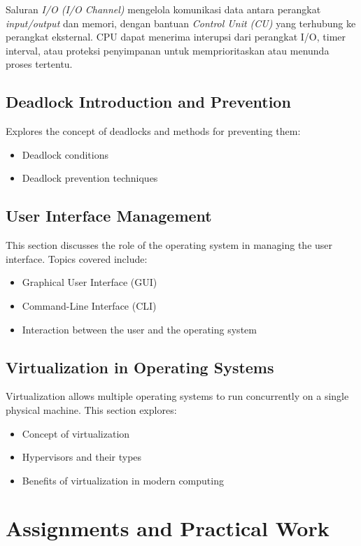 \documentclass[12pt]{article}
\begin{document}
Saluran \textit{I/O (I/O Channel)} mengelola komunikasi data antara perangkat \textit{input/output} dan memori, dengan bantuan \textit{Control Unit (CU)} yang terhubung ke perangkat eksternal. CPU dapat menerima interupsi dari perangkat I/O, timer interval, atau proteksi penyimpanan untuk memprioritaskan atau menunda proses tertentu.

\subsection{Deadlock Introduction and Prevention}
Explores the concept of deadlocks and methods for preventing them:
\begin{itemize}
    \item Deadlock conditions
    \item Deadlock prevention techniques
\end{itemize}

\subsection{User Interface Management}
This section discusses the role of the operating system in managing the user interface. Topics covered include:
\begin{itemize}
    \item Graphical User Interface (GUI)
    \item Command-Line Interface (CLI)
    \item Interaction between the user and the operating system
\end{itemize}

\subsection{Virtualization in Operating Systems}
Virtualization allows multiple operating systems to run concurrently on a single physical machine. This section explores:
\begin{itemize}
    \item Concept of virtualization
    \item Hypervisors and their types
    \item Benefits of virtualization in modern computing
\end{itemize}

\section{Assignments and Practical Work}
\end{document}
